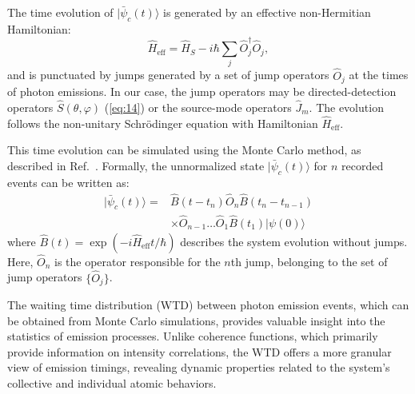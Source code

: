 \documentclass[aps,prl,twocolumn,superscriptaddress,showpacs,amsmath,amssymb]{revtex4-2}
\begin{document}
The time evolution of $ | \bar{\psi}_c(t) \rangle $ is generated by an effective non-Hermitian Hamiltonian:
\begin{equation}
    \hat{H}_\mathrm{eff} = \hat{H}_S - i \hbar \sum_j \hat{O}_j^\dagger \hat{O}_j,
\end{equation}
and is punctuated by jumps generated by a set of jump operators $ \hat{O}_j $ at the times of photon emissions. In our case, the jump operators may be directed-detection operators $ \hat{S}(\theta, \varphi) $ (\ref{eq:14}) or the source-mode operators $ \hat{J}_m $. The evolution follows the non-unitary Schrödinger equation with Hamiltonian $ \hat{H}_\mathrm{eff} $.

This time evolution can be simulated using the Monte Carlo method, as described in Ref.~\cite{carmichael2009statistical}. Formally, the unnormalized state $ | \bar{\psi}_c(t) \rangle $ for $ n $ recorded events can be written as:
\begin{align} 
    | \bar{\psi}_c(t) \rangle = & \hat{B}(t - t_n) \hat{O}_n \hat{B}(t_n - t_{n-1}) \nonumber \\ 
                                & \times \hat{O}_{n-1} \ldots \hat{O}_1 \hat{B}(t_1) |\psi(0) \rangle
    \label{eq:18}
\end{align}
where $ \hat{B}(t) = \exp(-i \hat{H}_\mathrm{eff} t / \hbar) $ describes the system evolution without jumps. Here, $ \hat{O}_n $ is the operator responsible for the $ n $th jump, belonging to the set of jump operators $ \{\hat{O}_j\} $.

The waiting time distribution (WTD) between photon emission events, which can be obtained from Monte Carlo simulations, provides valuable insight into the statistics of emission processes. 
Unlike coherence functions, which primarily provide information on intensity correlations, the WTD offers a more granular view of emission timings, revealing dynamic properties related to the system's collective and individual atomic behaviors.
\end{document}
